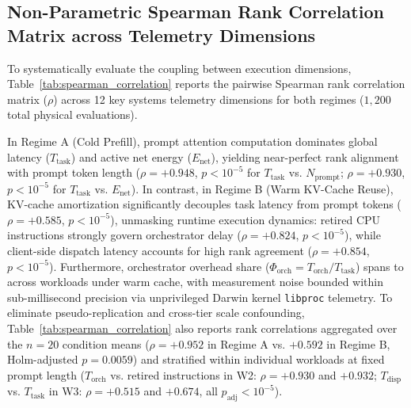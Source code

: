 \documentclass[11pt,a4paper]{article}
\begin{document}
\subsection{Non-Parametric Spearman Rank Correlation Matrix across Telemetry Dimensions}
To systematically evaluate the coupling between execution dimensions, Table~\ref{tab:spearman_correlation} reports the pairwise Spearman rank correlation matrix ($\rho$) across 12 key systems telemetry dimensions for both regimes ($1{,}200$ total physical evaluations).



In Regime A (Cold Prefill), prompt attention computation dominates global latency ($T_{\text{task}}$) and active net energy ($E_{\text{net}}$), yielding near-perfect rank alignment with prompt token length ($\rho = +0.948$, $p < 10^{-5}$ for $T_{\text{task}}$ vs. $N_{\text{prompt}}$; $\rho = +0.930$, $p < 10^{-5}$ for $T_{\text{task}}$ vs. $E_{\text{net}}$). In contrast, in Regime B (Warm KV-Cache Reuse), KV-cache amortization significantly decouples task latency from prompt tokens ($\rho = +0.585$, $p < 10^{-5}$), unmasking runtime execution dynamics: retired CPU instructions strongly govern orchestrator delay ($\rho = +0.824$, $p < 10^{-5}$), while client-side dispatch latency accounts for high rank agreement ($\rho = +0.854$, $p < 10^{-5}$). Furthermore, orchestrator overhead share ($\Phi_{\text{orch}} = T_{\text{orch}} / T_{\text{task}}$) spans \PhiOrchFifteenMin{} to \PhiOrchFifteenMax{} across workloads under warm cache, with measurement noise bounded within sub-millisecond precision via unprivileged Darwin kernel \texttt{libproc} telemetry. To eliminate pseudo-replication and cross-tier scale confounding, Table~\ref{tab:spearman_correlation} also reports rank correlations aggregated over the $n=20$ condition means ($\rho = +0.952$ in Regime A vs. $+0.592$ in Regime B, Holm-adjusted $p = 0.0059$) and stratified within individual workloads at fixed prompt length ($T_{\text{orch}}$ vs. retired instructions in W2: $\rho = +0.930$ and $+0.932$; $T_{\text{disp}}$ vs. $T_{\text{task}}$ in W3: $\rho = +0.515$ and $+0.674$, all $p_{\text{adj}} < 10^{-5}$).
\end{document}
